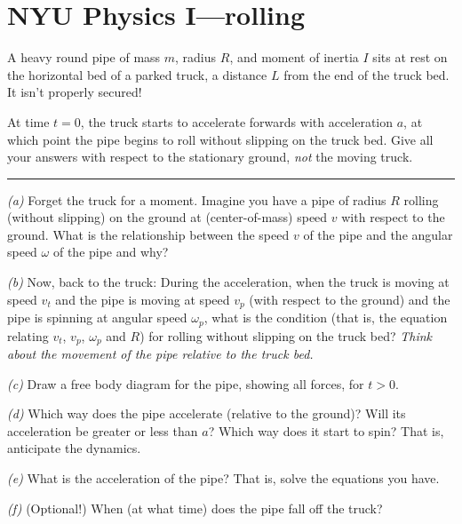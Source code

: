 \documentclass[12pt]{article}
\begin{document}
\section*{NYU Physics I---rolling}

A heavy round pipe of mass $m$, radius $R$, and moment of inertia $I$
sits at rest on the horizontal bed of a parked truck, a distance $L$
from the end of the truck bed.  It isn't properly secured!

At time $t=0$, the truck starts to
accelerate forwards with acceleration $a$, at which point the pipe
begins to roll without slipping on the truck bed.  Give all your
answers with respect to the stationary ground, {\em not} the moving
truck. \\ \rule{0.3\textwidth}{0pt}

\textsl{(a)} Forget the truck for a moment. Imagine you have a pipe
of radius $R$ rolling (without slipping) on the ground at (center-of-mass) speed $v$ with
respect to the ground. What is the relationship between the speed $v$ of the pipe
and the angular speed $\omega$ of the pipe and why?

\textsl{(b)} Now, back to the truck:
During the acceleration, when the truck is moving at
speed $v_t$ and the pipe is moving at speed $v_p$ (with respect to the
ground) and the pipe is spinning at angular speed $\omega_p$, what is
the condition (that is, the equation relating $v_t$, $v_p$, $\omega_p$
and $R$) for rolling without slipping on the truck bed?  \emph{Think
about the movement of the pipe relative to the truck bed.}

\textsl{(c)} Draw a free body diagram for the pipe, showing all
forces, for $t>0$.

\textsl{(d)} Which way does the pipe accelerate (relative to the
ground)?  Will its acceleration be greater or less than $a$?  Which
way does it start to spin?  That is, anticipate the dynamics.

\textsl{(e)} What is the acceleration of the pipe?  That is, solve the
equations you have.

\textsl{(f)} (Optional!) When (at what time) does the pipe fall off the truck?
\end{document}
